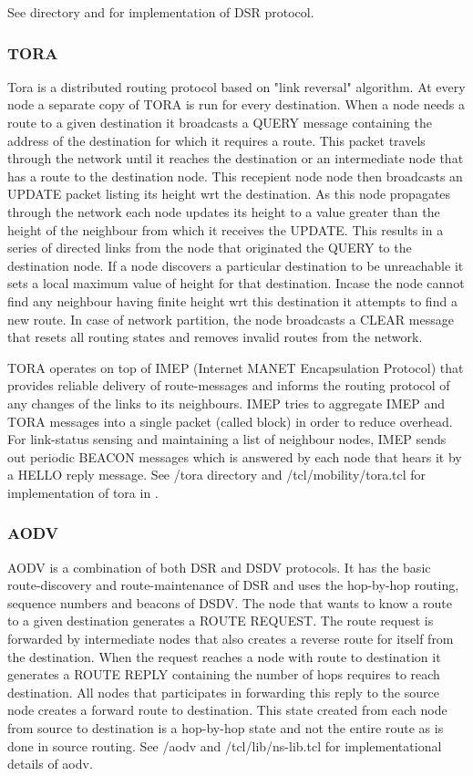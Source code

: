 See  directory and  for implementation
of DSR protocol. 

\subsubsection{TORA}
\label{sec:tora}

Tora is a distributed routing protocol based on "link reversal" algorithm. 
At every node a separate copy of TORA is run for every destination. When a
node needs a route to a given destination it broadcasts a QUERY message
containing the address of the destination for which it requires  a route.
This packet travels through the network until it reaches the destination
or an intermediate node that has a route to the destination node.
This recepient node node then broadcasts an UPDATE packet listing its
height wrt the destination. As this node propagates through the network
each node updates its height to a value greater than the height of the
neighbour from which it receives the UPDATE. This results in a series of
directed links from the node that originated the QUERY to the destination
node. If a node discovers a particular destination to be unreachable it
sets a local maximum value of height for that destination. Incase the node
cannot find any neighbour having finite height wrt this destination it
attempts to find a new route. In case of network partition, the node
broadcasts a CLEAR message that resets all routing states and removes
invalid routes from the network.

TORA operates on top of IMEP (Internet MANET Encapsulation Protocol) that
provides reliable delivery of route-messages and informs the routing
protocol of any changes of the links to its neighbours. IMEP tries to
aggregate IMEP and TORA messages into a single packet (called block) in
order to reduce overhead. For link-status sensing and maintaining a list
of neighbour nodes, IMEP sends out periodic BEACON messages which is
answered by each node that hears it by a HELLO reply message.
See \ns/tora directory and \ns/tcl/mobility/tora.tcl for implementation of
tora in \ns.

\subsubsection{AODV}
\label{sec:AODV}

AODV is a combination of both DSR and DSDV protocols. It has the basic
route-discovery and route-maintenance of DSR and uses the hop-by-hop
routing, sequence numbers and beacons of DSDV. The node that wants to know
a route to a given destination generates a ROUTE REQUEST. The route
request is forwarded by intermediate nodes that also creates a reverse
route for itself from the destination. When the request reaches a node
with route to destination it generates a ROUTE REPLY containing the number
of hops requires to reach destination. All nodes that participates in
forwarding this reply to the source node creates a forward route to
destination. This state created from each node from source to destination
is a hop-by-hop state and not the entire route as is done in source
routing.
See \ns/aodv and \ns/tcl/lib/ns-lib.tcl for implementational details
of aodv.


